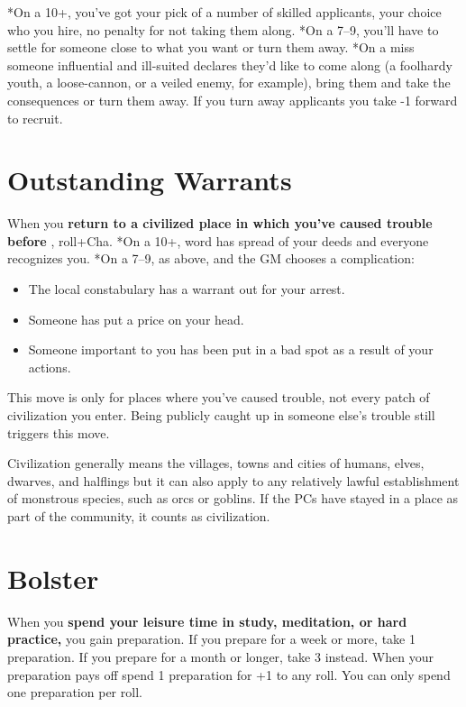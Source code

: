  *On a 10+, you've got your pick of a number of skilled applicants, your choice who you hire, no penalty for not taking them along. *On a 7--9, you'll have to settle for someone close to what you want or turn them away. *On a miss someone influential and ill-suited declares they'd like to come along (a foolhardy youth, a loose-cannon, or a veiled enemy, for example), bring them and take the consequences or turn them away. If you turn away applicants you take -1 forward to recruit.
\section*{Outstanding Warrants}
\HRule
 When you \textbf{return to a civilized place in which you've caused trouble before}
, roll+Cha. *On a 10+, word has spread of your deeds and everyone recognizes you. *On a 7--9, as above, and the GM chooses a complication:
\begin{itemize}
\item The local constabulary has a warrant out for your arrest.
\item Someone has put a price on your head.
\item Someone important to you has been put in a bad spot as a result of your actions.
\end{itemize}
\HRule

 This move is only for places where you've caused trouble, not every patch of civilization you enter. Being publicly caught up in someone else's trouble still triggers this move.


 Civilization generally means the villages, towns and cities of humans, elves, dwarves, and halflings but it can also apply to any relatively lawful establishment of monstrous species, such as orcs or goblins. If the PCs have stayed in a place as part of the community, it counts as civilization.
\section*{Bolster}
\HRule
 When you \textbf{spend your leisure time in study, meditation, or hard practice,}
 you gain preparation. If you prepare for a week or more, take 1 preparation. If you prepare for a month or longer, take 3 instead. When your preparation pays off spend 1 preparation for +1 to any roll. You can only spend one preparation per roll.
\HRule

